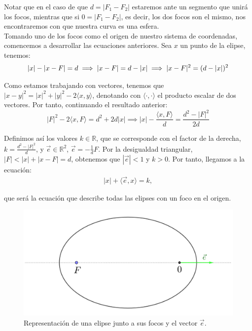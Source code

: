 Notar que en el caso de que $d=|F_1-F_2|$ estaremos ante un segmento que unirá los focos, mientras que si $0=|F_1-F_2|$, es decir, los dos focos son el mismo, nos encontraremos con que nuestra curva es una esfera.\\

Tomando uno de los focos como el origen de nuestro sistema de coordenadas, comencemos a desarrollar las ecuaciones anteriores. Sea $x$ un punto de la elipse, tenemos:
\[
|x|-|x-F|=d \implies |x-F|=d-|x| \implies |x-F|^2=(d-|x|)^2\\
\]

Como estamos trabajando con vectores, tenemos que $|x-y|^2=|x|^2+|y|^2-2\langle x,y\rangle$, denotando con $\langle\cdot,\cdot\rangle$ el producto escalar de dos vectores. Por tanto, continuando el resultado anterior:
\[
|F|^2-2\langle x,F\rangle=d^2+2d|x| \implies |x|-\frac{\langle x,F\rangle}{d}=\frac{d^2-|F|^2}{2d}
\]

Definimos así los valores $k\in\mathbb{R}$, que se corresponde con el factor de la derecha, $k=\frac{d^2-|F|^2}{d}$, y $\vec{e}\in\mathbb{R}^2$, $\vec{e}=-\frac{1}{d}F$. Por la desigualdad triangular, $|F|<|x|+|x-F|=d$, obtenemos que $|\vec{e}|<1$ y $k>0$. Por tanto, llegamos a la ecuación:
\begin{align}
|x|+\langle \vec{e},x\rangle=k,
\label{eq:elipse_cartesiana}
\end{align}

\noindent que será la ecuación que describe todas las elipses con un foco en el origen.\\

\begin{figure}[H]
\centering
\includegraphics[scale=0.12]{images/elipse_excentricidad.png}
\caption{Representación de una elipse junto a sus focos y el vector $\vec{e}$.}
\label{fig:elipse_excentricidad}
\end{figure}

